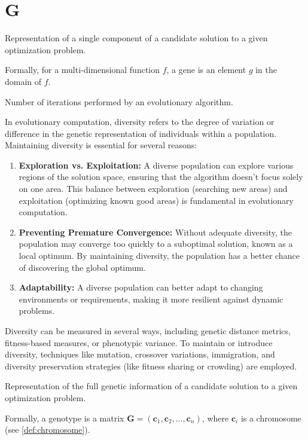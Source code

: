 \section*{G}
\begin{definition}[Gene]
  \label{def:gene}
    Representation of a single component of a candidate solution to a given 
    optimization problem.

    Formally, for a multi-dimensional function \(f\), a gene is an element 
    \(g\) in the domain of \(f\).
  \end{definition}

  \begin{definition}[Generation]
  \label{def:generation}
    Number of iterations performed by an evolutionary algorithm.
  \end{definition}
  
  \begin{definition}
  \label{def:diversity}
    In evolutionary computation, diversity refers to the degree of variation or 
    difference in the genetic representation of individuals within a 
    population.
    Maintaining diversity is essential for several reasons:

    \begin{enumerate}
      \item \textbf{Exploration vs. Exploitation:} A diverse population can 
        explore various regions of the solution space, ensuring that the 
        algorithm doesn't focus solely on one area.
        This balance between exploration (searching new areas) and exploitation 
        (optimizing known good areas) is fundamental in evolutionary 
        computation.
      \item \textbf{Preventing Premature Convergence:} Without adequate 
        diversity, the population may converge too quickly to a suboptimal 
        solution, known as a local optimum.
        By maintaining diversity, the population has a better chance of 
        discovering the global optimum.
      \item \textbf{Adaptability:} A diverse population can better adapt to 
        changing environments or requirements, making it more resilient against 
        dynamic problems.
    \end{enumerate}

    Diversity can be measured in several ways, including genetic distance 
    metrics, fitness-based measures, or phenotypic variance.
    To maintain or introduce diversity, techniques like mutation, crossover 
    variations, immigration, and diversity preservation strategies (like 
    fitness sharing or crowding) are employed.
  \end{definition}
  
  \begin{definition}[Genotype]
  \label{def:genotype}
    Representation of the full genetic information of a candidate solution to a given optimization
    problem.

    Formally, a genotype is a matrix \(\mathbf{G} = (\textbf{c}_1, \textbf{c}_2, \dots, 
    \textbf{c}_n)\), where \(\textbf{c}_i\) is a chromosome (see \vref{def:chromosome}).
  \end{definition}